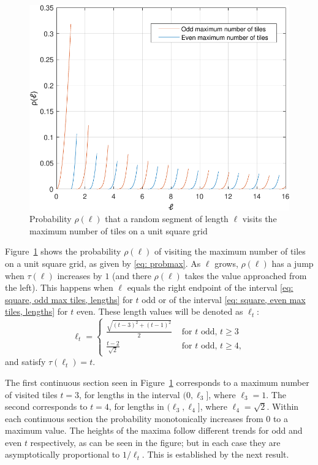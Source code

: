 \documentclass[12pt, a4paper]{article}
\newcommand{\funt}{\tau} %
\newcommand{\probmax}{\rho} %
\newcommand{\len}{\ell} %
\newcommand{\tiles}{t} %
\begin{document}
\begin{figure}%
\centering%
\includegraphics[width=.75\textwidth]{probmax_len}%
\caption{Probability $\probmax(\len)$ that a random segment of length $\len$ visits the maximum number of tiles on a unit square grid%
}%
\label{fig: probmax_len}%
\end{figure}%

Figure~\ref{fig: probmax_len} shows the probability $\probmax(\len)$ of visiting the maximum number of tiles on a unit square grid, as given by \eqref{eq: probmax}. As $\len$ grows, $\probmax(\len)$ has a jump when $\funt(\len)$ increases by $1$ (and there $\probmax(\len)$ takes the value approached from the left). This happens when $\len$ equals the right endpoint of the interval \eqref{eq: square, odd max tiles, lengths} for $\tiles$ odd or of the interval \eqref{eq: square, even max tiles, lengths} for $\tiles$ even. These length values will be denoted as $\len_\tiles$:
\begin{equation}
\len_\tiles = \begin{cases}
\displaystyle
\frac{\sqrt{(\tiles-3)^2 + (\tiles-1)^2}} {2} & \text{ for $\tiles$ odd, $\tiles \geq 3$} \\
\displaystyle
\frac{\tiles-2}{\sqrt{2}} & \text{ for $\tiles$ odd, $\tiles \geq 4$},
\end{cases}
\end{equation}
and satisfy $\funt(\len_\tiles) = \tiles$.

The first continuous section seen in Figure~\ref{fig: probmax_len} corresponds to a maximum number of visited tiles $\tiles=3$, for lengths in the interval $(0, \len_3]$, where $\len_3= 1$. The second corresponds to $\tiles=4$, for lengths in $(\len_3, \len_4]$, where $\len_4= \sqrt{2}$. Within each continuous section the probability monotonically increases from $0$ to a maximum value. The heights of the maxima follow different trends for odd and even $\tiles$ respectively, as can be seen in the figure; but in each case they are asymptotically proportional to $1/\len_\tiles$. This is established by the next result.
\end{document}
